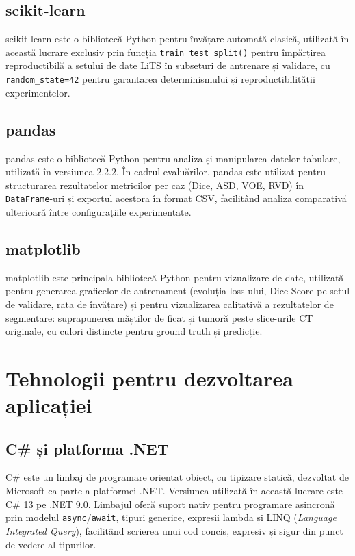 \documentclass[12pt, a4paper]{report}
\begin{document}
\subsection{scikit-learn}

scikit-learn este o bibliotecă Python pentru învățare automată clasică,
utilizată în această lucrare exclusiv prin funcția \texttt{train\_test\_split()}
pentru împărțirea reproductibilă a setului de date LiTS în subseturi de
antrenare și validare, cu \texttt{random\_state=42} pentru garantarea
determinismului și reproductibilității experimentelor.

\subsection{pandas}

pandas este o bibliotecă Python pentru analiza și manipularea datelor
tabulare, utilizată în versiunea 2.2.2. În cadrul evaluărilor, pandas este
utilizat pentru structurarea rezultatelor metricilor per caz
(Dice, ASD, VOE, RVD) în \texttt{DataFrame}-uri și exportul acestora în
format CSV, facilitând analiza comparativă ulterioară între configurațiile
experimentate.

\subsection{matplotlib}

matplotlib este principala bibliotecă Python pentru vizualizare de date,
utilizată pentru generarea graficelor de antrenament (evoluția loss-ului,
Dice Score pe setul de validare, rata de învățare) și pentru vizualizarea
calitativă a rezultatelor de segmentare: suprapunerea măștilor de ficat
și tumoră peste slice-urile CT originale, cu culori distincte pentru
ground truth și predicție.

\section{Tehnologii pentru dezvoltarea aplicației}

\subsection{C\# și platforma .NET}

C\# este un limbaj de programare orientat obiect, cu tipizare statică,
dezvoltat de Microsoft ca parte a platformei .NET. Versiunea utilizată
în această lucrare este C\# 13 pe .NET 9.0. Limbajul oferă suport nativ
pentru programare asincronă prin modelul \texttt{async}/\texttt{await},
tipuri generice, expresii lambda și LINQ (\textit{Language Integrated Query}),
facilitând scrierea unui cod concis, expresiv și sigur din punct de vedere
al tipurilor.
\end{document}
